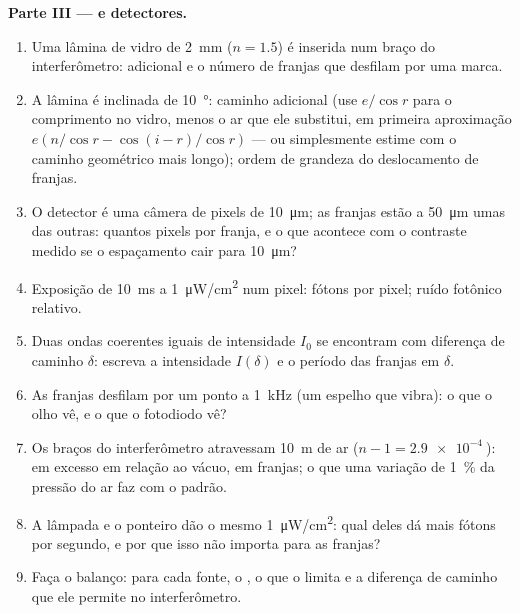 \begin{problem}
\medskip
\noindent\textbf{Parte III ---  e detectores.}
\begin{enumerate}[resume]
  \item Uma lâmina de vidro de \qty{2}{mm} ($n = 1.5$) é inserida num braço
        do interferômetro:  adicional e o número de
        franjas que desfilam por uma marca.
  \item A lâmina é inclinada de \qty{10}{\degree}: caminho adicional (use $e/\cos r$
        para o comprimento no vidro, menos o ar que ele substitui, em
        primeira aproximação $e(n/\cos r - \cos(i - r)/\cos r)$ --- ou simplesmente
        estime com o caminho geométrico mais longo); ordem de grandeza
        do deslocamento de franjas.
  \item O detector é uma câmera de pixels de \qty{10}{\micro m}; as franjas
        estão a \qty{50}{\micro m} umas das outras: quantos pixels por franja, e o que
        acontece com o contraste medido se o espaçamento cair para
        \qty{10}{\micro m}?
  \item Exposição de \qty{10}{ms} a \qty{1}{\micro W/cm^2} num pixel: fótons por
        pixel; ruído fotônico relativo.
  \item Duas ondas coerentes iguais de intensidade $I_0$ se encontram com diferença
        de caminho $\delta$: escreva a intensidade $I(\delta)$ e o período
        das franjas em $\delta$.
  \item As franjas desfilam por um ponto a \qty{1}{kHz} (um espelho que
        vibra): o que o olho vê, e o que o fotodiodo vê?
  \item Os braços do interferômetro atravessam \qty{10}{m} de ar ($n - 1 =
        \qty{2.9e-4}{}$):  em excesso em relação ao vácuo, em franjas;
        o que uma variação de \qty{1}{\%} da pressão do ar faz com o padrão.
  \item A lâmpada e o ponteiro dão o mesmo \qty{1}{\micro W/cm^2}: qual deles
        dá mais fótons por segundo, e por que isso não importa para
        as franjas?
  \item Faça o balanço: para cada fonte, o , o que o limita
        e a diferença de caminho que ele permite no interferômetro.
\end{enumerate}
\end{problem}

